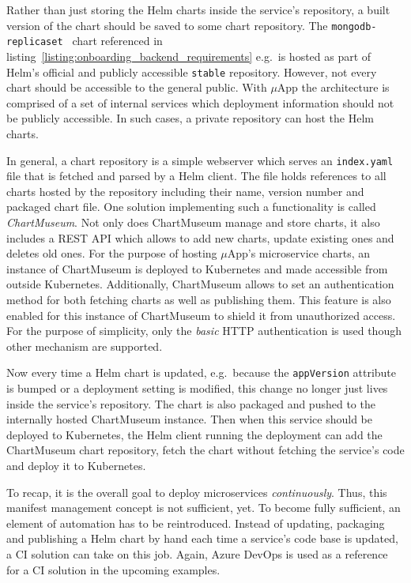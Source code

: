 Rather than just storing the Helm charts inside the service's repository, a
built version of the chart should be saved to some chart repository. The
\texttt{mongodb-replicaset } chart referenced in
listing~\ref{listing:onboarding_backend_requirements} e.g.\ is hosted as part
of Helm's official and publicly accessible \texttt{stable} repository. However,
not every chart should be accessible to the general public.  With $\mu$App the
architecture is comprised of a set of internal services which deployment
information should not be publicly accessible. In such cases, a private
repository can host the Helm charts.

In general, a chart repository is a simple webserver which serves an
\texttt{index.yaml} file that is fetched and parsed by a Helm client. The file
holds references to all charts hosted by the repository including their name,
version number and packaged chart file. One solution implementing such a
functionality is called \textit{ChartMuseum}. Not only does ChartMuseum manage
and store charts, it also includes a \ac{REST} \ac{API} which allows to add new
charts, update existing ones and deletes old ones. For the purpose of hosting
$\mu$App's microservice charts, an instance of ChartMuseum is deployed to
Kubernetes and made accessible from outside Kubernetes. Additionally,
ChartMuseum allows to set an authentication method for both fetching charts as
well as publishing them. This feature is also enabled for this instance of
ChartMuseum to shield it from unauthorized access. For the purpose of
simplicity, only the \textit{basic} \ac{HTTP} authentication is used though
other mechanism are supported.

Now every time a Helm chart is updated, e.g.\ because the \texttt{appVersion}
attribute is bumped or a deployment setting is modified, this change no longer
just lives inside the service's repository. The chart is also packaged and
pushed to the internally hosted ChartMuseum instance. Then when this service
should be deployed to Kubernetes, the Helm client running the deployment can
add the ChartMuseum chart repository, fetch the chart without fetching the
service's code and deploy it to Kubernetes.

To recap, it is the overall goal to deploy microservices \textit{continuously}.
Thus, this manifest management concept is not sufficient, yet. To become fully
sufficient, an element of automation has to be reintroduced. Instead of
updating, packaging and publishing a Helm chart by hand each time a service's
code base is updated, a \ac{CI} solution can take on this job. Again, Azure
DevOps is used as a reference for a \ac{CI} solution in the upcoming examples.

